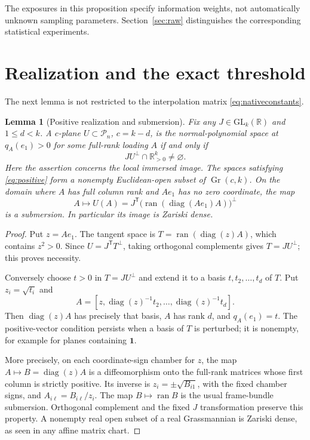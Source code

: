 \documentclass[11pt,reqno]{amsart}
\numberwithin{equation}{section}
\newtheorem{lemma}[theorem]{Lemma}
\theoremstyle{definition}\newtheorem{definition}[theorem]{Definition}
\theoremstyle{remark}\newtheorem{remark}[theorem]{Remark}
\newcommand{\R}{\mathbb R}
\newcommand{\PP}{\mathcal P}
\newcommand{\Gr}{\operatorname{Gr}}
\newcommand{\diag}{\operatorname{diag}}
\newcommand{\ran}{\operatorname{ran}}
\begin{document}
The exposures in this proposition specify information weights, not automatically unknown sampling parameters. Section~\ref{sec:raw} distinguishes the corresponding statistical experiments.

\section{Realization and the exact threshold}\label{sec:realization}
The next lemma is not restricted to the interpolation matrix \eqref{eq:nativeconstants}.
\begin{lemma}[Positive realization and submersion]\label{lem:realization}
Fix any $J\in\mathrm{GL}_k(\R)$ and $1\le d<k$. A $c$-plane $U\subset\PP_n$, $c=k-d$, is the normal-polynomial space at $q_A(e_1)>0$ for some full-rank loading $A$ if and only if
\begin{equation}\label{eq:positive}
 JU^\perp\cap\R^k_{>0}\ne\varnothing.
\end{equation}
Here the assertion concerns the local immersed image. The spaces satisfying \eqref{eq:positive} form a nonempty Euclidean-open subset of $\Gr(c,k)$. On the domain where $A$ has full column rank and $Ae_1$ has no zero coordinate, the map
\[
 A\longmapsto U(A)=J^{\mathsf T}\big(\ran(\diag(Ae_1)A)\big)^\perp
\]
is a submersion. In particular its image is Zariski dense.
\end{lemma}
\begin{proof}
Put $z=Ae_1$. The tangent space is $T=\ran(\diag(z)A)$, which contains $z^2>0$. Since $U=J^{\mathsf T}T^\perp$, taking orthogonal complements gives $T=JU^\perp$; this proves necessity.

Conversely choose $t>0$ in $T=JU^\perp$ and extend it to a basis $t,t_2,\ldots,t_d$ of $T$. Put $z_i=\sqrt{t_i}$ and
\[
 A=[z,\diag(z)^{-1}t_2,\ldots,\diag(z)^{-1}t_d].
\]
Then $\diag(z)A$ has precisely that basis, $A$ has rank $d$, and $q_A(e_1)=t$. The positive-vector condition persists when a basis of $T$ is perturbed; it is nonempty, for example for planes containing $\mathbf1$.

More precisely, on each coordinate-sign chamber for $z$, the map $A\mapsto B=\diag(z)A$ is a diffeomorphism onto the full-rank matrices whose first column is strictly positive. Its inverse is $z_i=\pm\sqrt{B_{i1}}$, with the fixed chamber signs, and $A_{i\ell}=B_{i\ell}/z_i$. The map $B\mapsto\ran B$ is the usual frame-bundle submersion. Orthogonal complement and the fixed $J$ transformation preserve this property. A nonempty real open subset of a real Grassmannian is Zariski dense, as seen in any affine matrix chart.
\end{proof}
\end{document}
